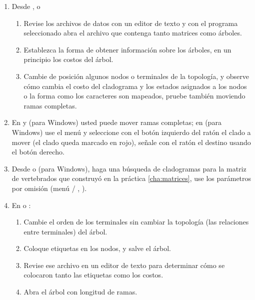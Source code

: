 \begin{enumerate}

	\item Desde ,  o 
	\begin{enumerate}
		\item Revise los archivos de datos con un editor de texto y con el programa seleccionado abra el archivo que contenga tanto matrices como \'arboles.
		\item Establezca la forma de obtener informaci\'on sobre los \'arboles, en un principio los costos del \'arbol.
		\item Cambie de posici\'on algunos nodos o terminales de la topolog\'ia, y observe c\'omo cambia el costo del cladograma y los estados asignados a los nodos o la forma como los caracteres son mapeados, pruebe tambi\'en moviendo ramas completas.
	\end{enumerate}

	\item En  y  (para Windows) usted puede mover ramas completas; en  (para Windows) use el men\'u  y seleccione con el bot\'on izquierdo del rat\'on el clado a mover (el clado queda marcado en rojo), se\~nale con el rat\'on el destino usando el bot\'on derecho.
	\item Desde  o  (para Windows), haga una b\'usqueda de cladogramas para la matriz de vertebrados que construy\'o en la pr\'actica \ref{cha:matrices}, use los par\'ametros por omisi\'on (men\'u  / , ).
	\item En  o :
	\begin{enumerate}
		\item Cambie el orden de los terminales sin cambiar la topolog\'ia (las relaciones entre terminales) del \'arbol.
		\item Coloque etiquetas en los nodos, y salve el \'arbol.
		\item Revise ese archivo en un editor de texto para determinar c\'omo se colocaron tanto las etiquetas como los costos.
		\item  Abra el \'arbol con longitud  de ramas.
	\end{enumerate}



\end{enumerate}
